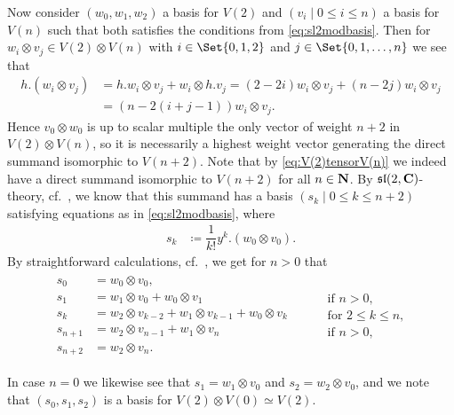 Now consider $(w_0,w_1,w_2)$ a basis for $V(2)$ and $(v_i \mid 0\leq i\leq n)$ a basis for $V(n)$ such that both satisfies the conditions from \cref{eq:sl2modbasis}. Then for $w_i\otimes v_j \in V(2)\otimes V(n)$ with $i\in\Set{0,1,2}$ and $j\in\Set{0,1,\dotsc,n}$ we see that
\begin{align}
  h.(w_i\otimes v_j) &= h.w_i\otimes v_j + w_i\otimes h.v_j = (2-2i)w_i\otimes v_j + (n-2j)w_i\otimes v_j \nonumber \\
  &= (n-2(i+j-1))w_i\otimes v_j.\label{eq:hontensor}
\end{align}
Hence $v_0\otimes w_0$ is up to scalar multiple the only vector of weight $n+2$ in $V(2)\otimes V(n)$, so it is necessarily a highest weight vector generating the direct summand isomorphic to $V(n+2)$. Note that by \cref{eq:V(2)tensorV(n)} we indeed have a direct summand isomorphic to $V(n+2)$ for all $n\in\mathbf{N}$. By $\mathfrak{sl}(2,\mathbf{C})$-theory, cf.\ \cite[36]{jantzen}, we know that this summand has a basis $(s_k\mid 0\leq k\leq n+2)$ satisfying equations as in \cref{eq:sl2modbasis}, where
\begin{align}\label{eq:s_kbasis}
  s_k &\coloneqq \dfrac{1}{k!} y^k.(w_0\otimes v_0).
\end{align}
By straightforward calculations, cf.\ , we get for $n>0$ that 
\begin{align}\label{eq:s_kbasisres}
  \begin{aligned}
    s_0 &= w_0\otimes v_0, \\
    s_1 &= w_1\otimes v_0 + w_0\otimes v_1 \\
    s_k &= w_2\otimes v_{k-2} + w_1\otimes v_{k-1} + w_0\otimes v_k \\
    s_{n+1} &= w_2\otimes v_{n-1} + w_1\otimes v_n \\
    s_{n+2} &= w_2\otimes v_n.
  \end{aligned} &&
                   \begin{aligned}
                     &\phantom{a}\\ &\mbox{if }n>0, \\ &\mbox{for }2\leq k\leq n, \\ &\mbox{if }n>0,\\ &\phantom{a}
                   \end{aligned}
\end{align}

In case $n=0$ we likewise see that $s_1=w_1\otimes v_0$ and $s_2=w_2\otimes v_0$, and we note that $(s_0,s_1,s_2)$ is a basis for $V(2)\otimes V(0)\simeq V(2)$.

